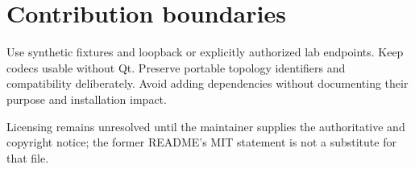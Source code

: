 \section*{Contribution boundaries}
Use synthetic fixtures and loopback or explicitly authorized lab endpoints. Keep codecs usable without Qt. Preserve portable topology identifiers and compatibility deliberately. Avoid adding dependencies without documenting their purpose and installation impact.

Licensing remains unresolved until the maintainer supplies the authoritative  and copyright notice; the former README's MIT statement is not a substitute for that file.

